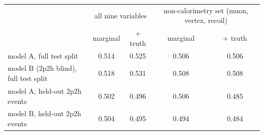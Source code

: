 \begin{tabular}{lcccc}
\toprule
 & \multicolumn{2}{c}{all nine variables} & \multicolumn{2}{c}{non-calorimetry set (muon, vertex, recoil)} \\
 & marginal & + truth & marginal & + truth \\
\midrule
model A, full test split & 0.514 & 0.525 & 0.506 & 0.506 \\
model B (2p2h blind), full test split & 0.518 & 0.531 & 0.508 & 0.508 \\
model A, held-out 2p2h events & 0.502 & 0.496 & 0.506 & 0.485 \\
model B, held-out 2p2h events & 0.504 & 0.495 & 0.494 & 0.484 \\
\bottomrule
\end{tabular}
